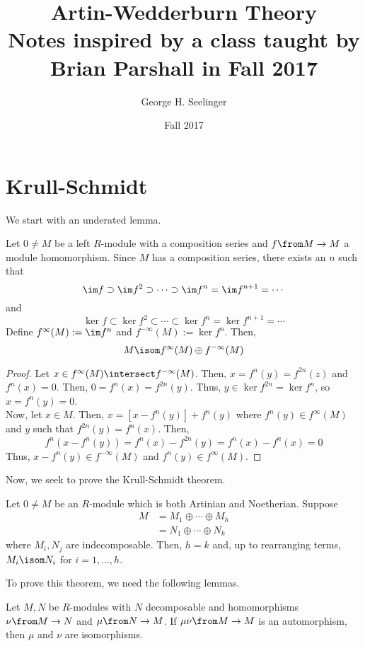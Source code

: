 \documentclass[11pt,leqno,oneside]{amsbook}
\title[Artin-Wedderburn Theory]{Artin-Wedderburn Theory \\ Notes
  inspired by a class taught by Brian Parshall in Fall 2017}
\author{George H. Seelinger}
\date{Fall 2017}
\numberwithin{thm}{section}
\begin{document}
\maketitle
\section{Krull-Schmidt}
We start with an underated lemma.
\begin{thm}
  Let \(0 \neq M\) be a left \(R\)-module with a composition series
  and \(f \from M \to M\) a module homomorphism. Since \(M\) has a
  composition series, there exists an
  \(n\) such that \[
    \im f \supset \im f^2 \supset \cdots \supset \im f^n = \im f^{n+1}
    = \cdots
  \]
  and \[
    \ker f \subset \ker f^2 \subset \cdots \subset \ker f^n = \ker
    f^{n+1} = \cdots 
  \]
  Define \(f^\infty(M) := \im f^n\) and \(f^{-\infty}(M) := \ker
  f^n\). Then, \[
    M \isom f^\infty(M) \oplus f^{-\infty}(M)
  \]
\end{thm}
\begin{proof}
  Let \(x \in f^\infty(M) \intersect f^{-\infty}(M)\). Then, \(x =
  f^n(y) = f^{2n}(z)\) and \(f^n(x) = 0\). Then, \(0 = f^n(x) =
  f^{2n}(y)\). Thus, \(y \in \ker f^{2n} = \ker f^n\), so \(x = f^n(y)
  = 0\). \\

  Now, let \(x \in M\). Then, \(x = [x-f^n(y)]+f^n(y)\) where \(f^n(y)
  \in f^\infty(M)\) and \(y\) such that \(f^{2n}(y) =
  f^n(x)\). Then, \[
    f^n(x-f^n(y)) = f^n(x) - f^{2n}(y) = f^n(x) - f^n(x) = 0
  \]
  Thus, \(x - f^n(y) \in f^{-\infty}(M)\) and \(f^n(y) \in
  f^\infty(M)\). 
\end{proof}
Now, we seek to prove the Krull-Schmidt theorem.
\begin{thm}
  Let \(0 \neq M\) be an \(R\)-module which is both Artinian and
  Noetherian. Suppose
  \begin{align*}
    M & = M_1 \oplus \cdots \oplus M_h \\
    & = N_1 \oplus \cdots \oplus N_k
  \end{align*}
  where \(M_i, N_j\) are indecomposable. Then, \(h=k\) and, up to
  rearranging terms, \(M_i \isom N_i\) for \(i = 1, \ldots, h\). 
\end{thm}
To prove this theorem, we need the following lemmas.
\begin{lem}
  Let \(M,N\) be \(R\)-modules with \(N\) decomposable and
  homomorphisms \(\nu \from M \to N\) and \(\mu \from N \to M\). If
  \(\mu \nu \from M \to M\) is an automorphism, then \(\mu\) and
  \(\nu\) are isomorphisms.
\end{lem}
\end{document}
